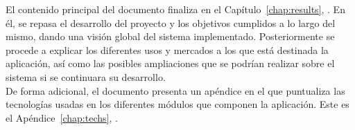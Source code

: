 El contenido principal del documento finaliza en el Capítulo~\ref{chap:results}, \textit{}. En él, se repasa el desarrollo del proyecto y los objetivos cumplidos a lo largo del mismo, dando una visión global del sistema implementado. Posteriormente se procede a explicar los diferentes usos y mercados a los que está destinada la aplicación, así como las posibles ampliaciones que se podrían realizar sobre el sistema si se continuara su desarrollo.\\

De forma adicional, el documento presenta un apéndice en el que puntualiza las tecnologías usadas en los diferentes módulos que componen la aplicación. Este es el Apéndice~\ref{chap:techs}, \textit{}.



